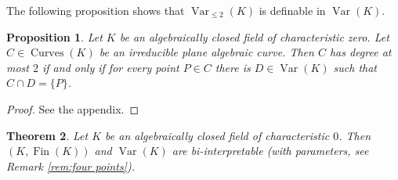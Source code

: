 \documentclass{amsart}
\newcommand{\Fin}{\operatorname{Fin}}
\theoremstyle{plain}
\newtheorem{thm}{Theorem}[section]
\newtheorem{prop}[thm]{Proposition}
\theoremstyle{definition}
\newcommand{\Var}[1]{\operatorname{Var}(#1)}
\newcommand{\nVar}[2]{\operatorname{Var}_{#2} (#1)}
\newcommand{\Curves}[1]{\operatorname{Curves}(#1)}
\begin{document}
The following proposition shows that $\nVar K {\leq 2}$ is definable in $\Var K$. 

\begin{prop}{\cite[Proposition 2.6]{MD}} \label{prop:2curves}
Let $K$ be an algebraically closed field of characteristic zero. Let $C \in \Curves{K}$ be an irreducible plane algebraic curve. Then $C$ has degree at most $2$ if and only if for every point $P\in C$ 
there is $D\in \Var{K}$ such that $C \cap D = \{P\}$.
\end{prop}
\begin{proof} See the appendix. \end{proof}

\begin{thm} \label{thm:biinterprable}
Let $K$ be an algebraically closed field of characteristic $0$. Then $(K,\Fin(K))$ and $\Var{K}$ are bi-interpretable (with parameters, see Remark \ref{rem:four points}). 
\end{thm}
\end{document}
